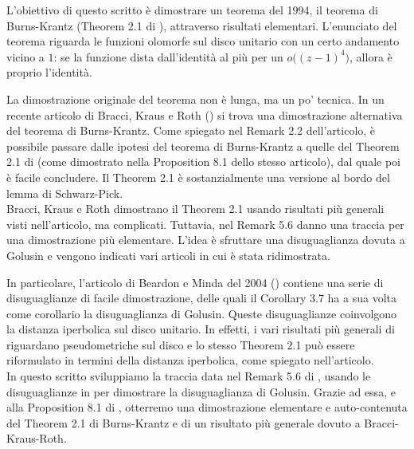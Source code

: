 L'obiettivo di questo scritto è dimostrare un teorema del 1994, il teorema di Burns-Krantz (Theorem 2.1 di \cite{BK}), attraverso risultati elementari. L'enunciato del teorema riguarda le funzioni olomorfe sul disco unitario con un certo andamento vicino a $1$: se la funzione dista dall'identità al più per un $o\bigl((z-1)^4\bigr)$, allora è proprio l'identità.

La dimostrazione originale del teorema non è lunga, ma un po' tecnica. In un recente articolo di Bracci, Kraus e Roth (\cite{BKR}) si trova una dimostrazione alternativa del teorema di Burns-Krantz. Come spiegato nel Remark 2.2 dell'articolo, è possibile passare dalle ipotesi del teorema di Burns-Krantz a quelle del Theorem 2.1 di \cite{BKR} (come dimostrato nella Proposition 8.1 dello stesso articolo), dal quale poi è facile concludere. Il Theorem 2.1 è sostanzialmente una versione al bordo del lemma di Schwarz-Pick. \\

Bracci, Kraus e Roth dimostrano il Theorem 2.1 usando risultati più generali visti nell'articolo, ma complicati. Tuttavia, nel Remark 5.6 danno una traccia per una dimostrazione più elementare. L'idea è sfruttare una disuguaglianza dovuta a Golusin e vengono indicati vari articoli in cui è stata ridimostrata.

In particolare, l'articolo di Beardon e Minda del 2004 (\cite{BM}) contiene una serie di disuguaglianze di facile dimostrazione, delle quali il Corollary 3.7 ha a sua volta come corollario la disuguaglianza di Golusin. Queste disuguaglianze coinvolgono la distanza iperbolica sul disco unitario. In effetti, i vari risultati più generali di \cite{BK} riguardano pseudometriche sul disco e lo stesso Theorem 2.1 può essere riformulato in termini della distanza iperbolica, come spiegato nell'articolo. \\

In questo scritto sviluppiamo la traccia data nel Remark 5.6 di \cite{BKR}, usando le disuguaglianze in \cite{BM} per dimostrare la disuguaglianza di Golusin. Grazie ad essa, e alla Proposition 8.1 di \cite{BKR}, otterremo una dimostrazione elementare e auto-contenuta del Theorem 2.1 di Burns-Krantz e di un risultato più generale dovuto a Bracci-Kraus-Roth.
